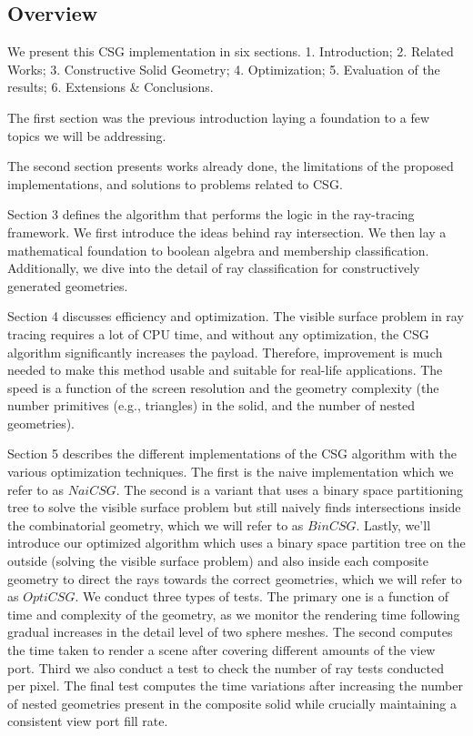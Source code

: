\documentclass[a4paper,11pt,oneside]{article}
\begin{document}
\subsection{Overview}
  
We present this CSG implementation in six sections. 1. Introduction;  2. Related Works; 3. Constructive Solid Geometry; 4. Optimization; 5. Evaluation of the results; 6. Extensions \& Conclusions.

The first section was the previous introduction laying a foundation to a few topics we will be addressing. 
  
The second section presents works already done, the limitations of the proposed implementations, and solutions to problems related to CSG.
  
Section 3 defines the algorithm that performs the logic in the ray-tracing framework. We first introduce the ideas behind ray intersection. We then lay a mathematical foundation to boolean algebra and membership classification. Additionally, we dive into the detail of ray classification for constructively generated geometries. 
  
Section 4 discusses efficiency and optimization. The visible surface problem in ray tracing requires a lot of CPU time, and without any optimization, the CSG algorithm significantly increases the payload. Therefore, improvement is much needed to make this method usable and suitable for real-life applications. The speed is a function of the screen resolution and the geometry complexity (the number primitives (e.g., triangles) in the solid, and the number of nested geometries).
  
Section 5 describes the different implementations of the CSG algorithm with the various optimization techniques. The first is the naive implementation which we refer to as $NaiCSG$. The second is a variant that uses a binary space partitioning tree to solve the visible surface problem but still naively finds intersections inside the combinatorial geometry, which we will refer to as $BinCSG$. Lastly, we'll introduce our optimized algorithm which uses a binary space partition tree on the outside (solving the visible surface problem) and also inside each composite geometry to direct the rays towards the correct geometries, which we will refer to as $OptiCSG$. We conduct three types of tests. The primary one is a function of time and complexity of the geometry, as we monitor the rendering time following gradual increases in the detail level of two sphere meshes. The second computes the time taken to render a scene after covering different amounts of the view port. Third we also conduct a test to check the number of ray tests conducted per pixel. The final test computes the time variations after increasing the number of nested geometries present in the composite solid while crucially maintaining a consistent view port fill rate.
  
\end{document}
